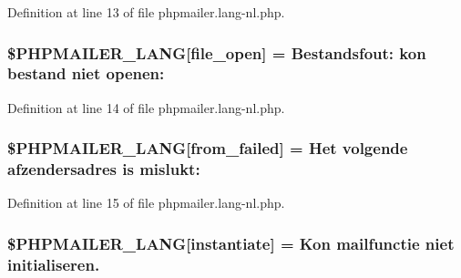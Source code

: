 Definition at line 13 of file phpmailer.\+lang-\/nl.\+php.

\subsubsection[{\texorpdfstring{\$\+P\+H\+P\+M\+A\+I\+L\+E\+R\+\_\+\+L\+A\+NG}{$PHPMAILER_LANG}}]{\setlength{\rightskip}{0pt plus 5cm}\$P\+H\+P\+M\+A\+I\+L\+E\+R\+\_\+\+L\+A\+NG\mbox{[}\textquotesingle{}file\+\_\+open\textquotesingle{}\mbox{]} = \textquotesingle{}Bestandsfout\+: kon bestand niet openen\+: \textquotesingle{}}\hypertarget{phpmailer_8lang-nl_8php_a28d1a6517bf4c942a0ddd506188ad2e0}{}\label{phpmailer_8lang-nl_8php_a28d1a6517bf4c942a0ddd506188ad2e0}


Definition at line 14 of file phpmailer.\+lang-\/nl.\+php.

\subsubsection[{\texorpdfstring{\$\+P\+H\+P\+M\+A\+I\+L\+E\+R\+\_\+\+L\+A\+NG}{$PHPMAILER_LANG}}]{\setlength{\rightskip}{0pt plus 5cm}\$P\+H\+P\+M\+A\+I\+L\+E\+R\+\_\+\+L\+A\+NG\mbox{[}\textquotesingle{}from\+\_\+failed\textquotesingle{}\mbox{]} = \textquotesingle{}Het volgende afzendersadres is mislukt\+: \textquotesingle{}}\hypertarget{phpmailer_8lang-nl_8php_adf832ae12155a09be077c6d5e4fd7e22}{}\label{phpmailer_8lang-nl_8php_adf832ae12155a09be077c6d5e4fd7e22}


Definition at line 15 of file phpmailer.\+lang-\/nl.\+php.

\subsubsection[{\texorpdfstring{\$\+P\+H\+P\+M\+A\+I\+L\+E\+R\+\_\+\+L\+A\+NG}{$PHPMAILER_LANG}}]{\setlength{\rightskip}{0pt plus 5cm}\$P\+H\+P\+M\+A\+I\+L\+E\+R\+\_\+\+L\+A\+NG\mbox{[}\textquotesingle{}instantiate\textquotesingle{}\mbox{]} = \textquotesingle{}Kon mailfunctie niet initialiseren.\textquotesingle{}}\hypertarget{phpmailer_8lang-nl_8php_ad58dde16780f4770ccf4dd282ea1f5ad}{}\label{phpmailer_8lang-nl_8php_ad58dde16780f4770ccf4dd282ea1f5ad}


